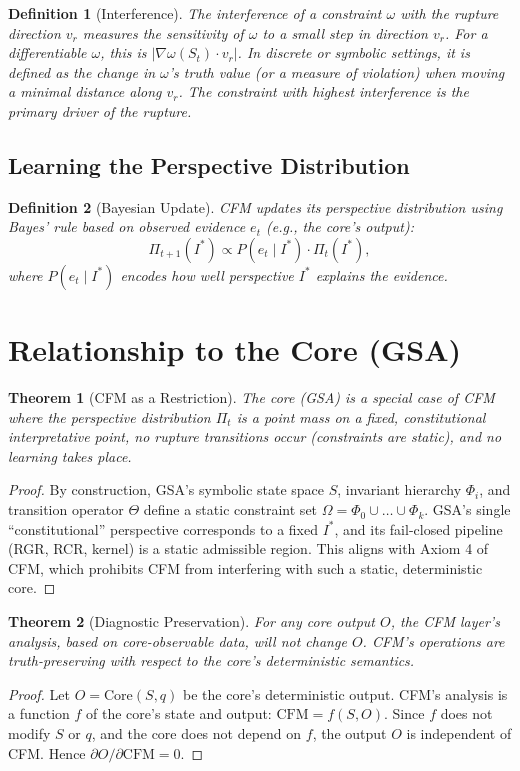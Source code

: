 \documentclass{article}
\newtheorem{definition}{Definition}[section]
\newtheorem{theorem}{Theorem}[section]
\begin{document}
\begin{definition}[Interference]
The \emph{interference} of a constraint \(\omega\) with the rupture direction \(v_r\) measures the sensitivity of \(\omega\) to a small step in direction \(v_r\). For a differentiable \(\omega\), this is \(|\nabla \omega(S_t) \cdot v_r|\). In discrete or symbolic settings, it is defined as the change in \(\omega\)'s truth value (or a measure of violation) when moving a minimal distance along \(v_r\). The constraint with highest interference is the primary driver of the rupture.
\end{definition}

\subsection{Learning the Perspective Distribution}
\begin{definition}[Bayesian Update]
CFM updates its perspective distribution using Bayes' rule based on observed evidence \(e_t\) (e.g., the core's output):
\[
\Pi_{t+1}(I^*) \propto P(e_t \mid I^*) \cdot \Pi_t(I^*),
\]
where \(P(e_t \mid I^*)\) encodes how well perspective \(I^*\) explains the evidence.
\end{definition}

\section{Relationship to the Core (GSA)}
\begin{theorem}[CFM as a Restriction]
The core (GSA) is a special case of CFM where the perspective distribution \(\Pi_t\) is a point mass on a fixed, constitutional interpretative point, no rupture transitions occur (constraints are static), and no learning takes place.
\end{theorem}
\begin{proof}
By construction, GSA's symbolic state space \(S\), invariant hierarchy \(\Phi_i\), and transition operator \(\Theta\) define a static constraint set \(\Omega = \Phi_0 \cup \dots \cup \Phi_k\). GSA's single ``constitutional'' perspective corresponds to a fixed \(I^*\), and its fail-closed pipeline (RGR, RCR, kernel) is a static admissible region. This aligns with Axiom 4 of CFM, which prohibits CFM from interfering with such a static, deterministic core.
\end{proof}

\begin{theorem}[Diagnostic Preservation]
For any core output \(O\), the CFM layer's analysis, based on core-observable data, will not change \(O\). CFM's operations are truth-preserving with respect to the core's deterministic semantics.
\end{theorem}
\begin{proof}
Let \(O = \text{Core}(S, q)\) be the core's deterministic output. CFM's analysis is a function \(f\) of the core's state and output: \(\text{CFM} = f(S, O)\). Since \(f\) does not modify \(S\) or \(q\), and the core does not depend on \(f\), the output \(O\) is independent of CFM. Hence \(\partial O / \partial \text{CFM} = 0\).
\end{proof}
\end{document}
